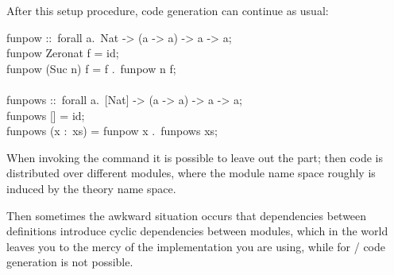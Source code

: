 \begin{isabellebody}
\begin{isamarkuptext}
  After this setup procedure, code generation can continue as usual:%
\end{isamarkuptext}%
\isamarkuptrue%
%
\isadelimquote
%
\endisadelimquote
%
\isatagquote
%
\begin{isamarkuptext}%
\isatypewriter%
\noindent%
\hspace*{0pt}funpow ::~forall a.~Nat -> (a -> a) -> a -> a;\\
\hspace*{0pt}funpow Zero{}nat f = id;\\
\hspace*{0pt}funpow (Suc n) f = f .~funpow n f;\\
\hspace*{0pt}\\
\hspace*{0pt}funpows ::~forall a.~[Nat] -> (a -> a) -> a -> a;\\
\hspace*{0pt}funpows [] = id;\\
\hspace*{0pt}funpows (x :~xs) = funpow x .~funpows xs;%
\end{isamarkuptext}%
\isamarkuptrue%
%
\endisatagquote
{\isafoldquote}%
%
\isadelimquote
%
\endisadelimquote
%
\isamarkuptrue%
%
\begin{isamarkuptext}%
When invoking the \hyperlink{command.export-code}{\mbox{}} command it is possible to leave
  out the \hyperlink{keyword.module-name}{\mbox{}} part;  then code is distributed over
  different modules, where the module name space roughly is induced
  by the  theory name space.

  Then sometimes the awkward situation occurs that dependencies between
  definitions introduce cyclic dependencies between modules, which in the
   world leaves you to the mercy of the  implementation
  you are using,  while for / code generation is not possible.


\end{isamarkuptext}
\end{isabellebody}
